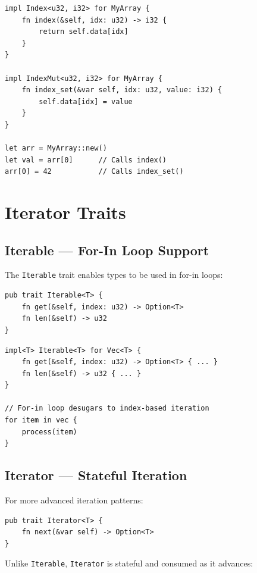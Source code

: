 \begin{lstlisting}
impl Index<u32, i32> for MyArray {
    fn index(&self, idx: u32) -> i32 {
        return self.data[idx]
    }
}

impl IndexMut<u32, i32> for MyArray {
    fn index_set(&var self, idx: u32, value: i32) {
        self.data[idx] = value
    }
}

let arr = MyArray::new()
let val = arr[0]      // Calls index()
arr[0] = 42           // Calls index_set()
\end{lstlisting}

\section{Iterator Traits}
\label{sec:iterator-traits}

\subsection{Iterable --- For-In Loop Support}

The \texttt{Iterable} trait enables types to be used in for-in loops:

\begin{lstlisting}
pub trait Iterable<T> {
    fn get(&self, index: u32) -> Option<T>
    fn len(&self) -> u32
}
\end{lstlisting}

\begin{lstlisting}
impl<T> Iterable<T> for Vec<T> {
    fn get(&self, index: u32) -> Option<T> { ... }
    fn len(&self) -> u32 { ... }
}

// For-in loop desugars to index-based iteration
for item in vec {
    process(item)
}
\end{lstlisting}

\subsection{Iterator --- Stateful Iteration}

For more advanced iteration patterns:

\begin{lstlisting}
pub trait Iterator<T> {
    fn next(&var self) -> Option<T>
}
\end{lstlisting}

Unlike \texttt{Iterable}, \texttt{Iterator} is stateful and consumed as it advances:


